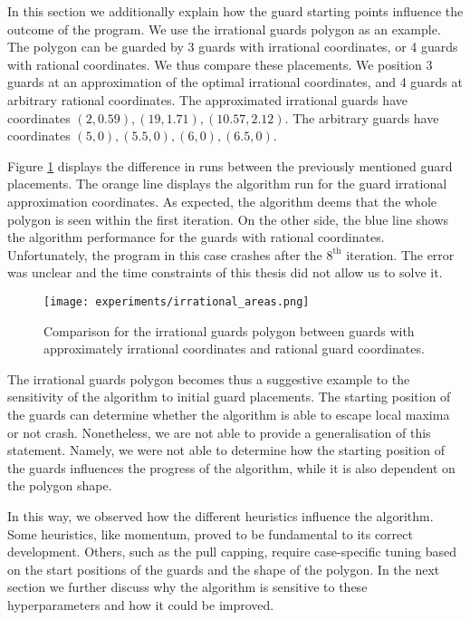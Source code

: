 In this section we  additionally explain how the guard starting points influence the outcome of the program. We  use the irrational guards polygon \cite{abrahamsen2021art} as an example.
The polygon can be guarded by 3 guards with irrational coordinates, or 4 guards with rational coordinates. We  thus compare these placements. We  position 3 guards at an approximation of the optimal irrational coordinates, and 4 guards at arbitrary rational coordinates. The approximated irrational guards  have coordinates $(2, 0.59), (19, 1.71), (10.57, 2.12)$. The arbitrary guards  have coordinates $(5, 0), (5.5, 0), (6, 0), (6.5, 0)$.

Figure \ref{fig:irrational} displays the difference in runs between the previously mentioned guard placements. The orange line displays the algorithm run for the guard irrational approximation coordinates. As expected, the algorithm deems that the whole polygon is seen within the first iteration. On the other side, the blue line shows the algorithm performance for the guards with rational coordinates. Unfortunately, the program in this case crashes after the $8^{\text{th}}$ iteration. The error was unclear and the time constraints of this thesis did not allow us to solve it.

\begin{figure}[!h]
    \centering
    \texttt{[image: experiments/irrational\_areas.png]}
    \caption{Comparison for the irrational guards polygon between guards with approximately irrational coordinates and rational guard coordinates.}
    \label{fig:irrational}
\end{figure}

The irrational guards polygon becomes thus a suggestive example to the sensitivity of the algorithm to initial guard placements. The starting position of the guards can determine whether the algorithm is able to escape local maxima or not crash. Nonetheless, we are not able to provide a generalisation of this statement. Namely, we were not able to determine how the starting position of the guards influences the progress of the algorithm, while it is also dependent on the polygon shape.

In this way, we observed how the different heuristics influence the algorithm. Some heuristics, like momentum, proved to be fundamental to its correct development. Others, such as the pull capping, require case-specific tuning based on the start positions of the guards and the shape of the polygon.
In the next section we further discuss why the algorithm is sensitive to these hyperparameters and how it could be improved.